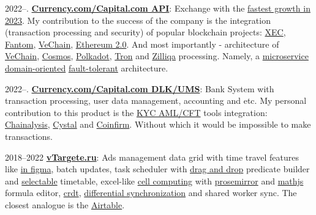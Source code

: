 \documentclass{yb}
\begin{document}
2022--. \href{https://currency.com/}{\textbf{Currency.com/Capital.com API}}: Exchange with the \href{https://financefeeds.com/who-won-the-forexbrokers-com-2023-annual-awards/}{fastest growth in 2023}. My contribution to the success of the company is the integration (transaction processing and security) of popular blockchain projects: \href{https://currency.com/ecash-xec-price-prediction}{XEC}, \href{https://currency.com/fantom-ftm-news-price-analysis}{Fantom}, \href{https://currency.com/what-is-vechain-your-ultimate-guide}{VeChain}, \href{https://currency.com/eth-2-0-what-s-happened-so-far-and-when-is-the-next-phase}{Ethereum 2.0}. And most importantly - architecture of \href{https://github.com/vechain/connex}{VeChain}, \href{https://github.com/cosmos/cosmjs}{Cosmos}, \href{https://github.com/polkadot-js/api}{Polkadot}, \href{https://github.com/tronprotocol/tronweb}{Tron} and \href{https://github.com/Zilliqa/zilliqa-js}{Zilliqa} processing. Namely, a \href{https://microservices.io/patterns/microservices.html}{microservice} \href{https://thedomaindrivendesign.io/distilling-domain/}{domain-oriented} \href{https://microservices.io/patterns/data/transactional-outbox.html}{fault-tolerant} architecture.

2022--. \href{https://currency.com/}{\textbf{Currency.com/Capital.com DLK/UMS}}: Bank System with transaction processing, user data management, accounting and etc. My personal contribution to this product is the \href{https://en.wikipedia.org/wiki/Know_your_customer}{KYC AML/CFT} tools integration: \href{https://demo.chainalysis.com/request-a-demo/}{Chainalysis}, \href{https://crystalblockchain.com/}{Cystal} and \href{https://www.coinfirm.com/}{Coinfirm}. Without which it would be impossible to make transactions.

2018--2022 \href{https://vtargete.ru/}{\textbf{vTargete.ru}}: Ads management data grid 
with time travel features like \href{https://www.figma.com/blog/how-figmas-multiplayer-technology-works/}{in figma}, 
batch updates, 
task scheduler with \href{https://sortablejs.github.io/Sortable/}{drag and drop} predicate builder and \href{https://simonwep.github.io/selection/}{selectable} timetable, 
excel-like  \href{https://www.sciencedirect.com/topics/computer-science/calculation-formula}{cell computing} with \href{https://prosemirror.net/}{prosemirror} and \href{https://mathjs.org/}{mathjs} formula editor, \href{https://en.wikipedia.org/wiki/Conflict-free_replicated_data_type}{crdt}, \href{https://static.googleusercontent.com/media/research.google.com/ru//pubs/archive/35605.pdf}{differential synchronization} and shared worker sync. The closest analogue is the \href{https://www.airtable.com/}{Airtable}.
\end{document}
